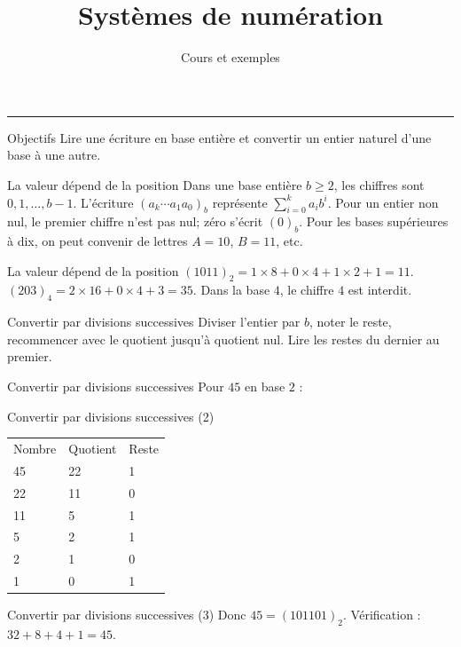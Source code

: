 \documentclass[aspectratio=169,10pt]{beamer}
\title{Systèmes de numération}
\subtitle{Cours et exemples}
\date{}
\author{}
\begin{document}
\begin{frame}[plain]
\vfill
{\inserttitle\par}
\medskip
{\insertsubtitle\par}
\medskip
{\rule{\textwidth}{.5pt}}
\vfill
\end{frame}
\begin{frame}{Objectifs}
Lire une écriture en base entière et convertir un entier naturel d’une base à une autre.
\end{frame}
\begin{frame}{La valeur dépend de la position}
Dans une base entière \(b\ge2\), les chiffres sont \(0,1,\ldots,b-1\). L’écriture \((a_k\cdots a_1a_0)_b\) représente \(\sum_{i=0}^k a_i b^i\). Pour un entier non nul, le premier chiffre n’est pas nul; zéro s’écrit \((0)_b\). Pour les bases supérieures à dix, on peut convenir de lettres \(A=10\), \(B=11\), etc.
\end{frame}
\begin{frame}{La valeur dépend de la position}
\((1011)_2=1\times8+0\times4+1\times2+1=11\). \((203)_4=2\times16+0\times4+3=35\). Dans la base \(4\), le chiffre \(4\) est interdit.
\end{frame}
\begin{frame}{Convertir par divisions successives}
Diviser l’entier par \(b\), noter le reste, recommencer avec le quotient jusqu’à quotient nul. Lire les restes du dernier au premier.
\end{frame}
\begin{frame}{Convertir par divisions successives}
Pour \(45\) en base \(2\) :
\end{frame}
\begin{frame}{Convertir par divisions successives (2)}
\begin{center}\begin{tabular}{lll}
Nombre & Quotient & Reste \\ 
45 & 22 & 1 \\ 
22 & 11 & 0 \\ 
11 & 5 & 1 \\ 
5 & 2 & 1 \\ 
2 & 1 & 0 \\ 
1 & 0 & 1 \\ 
\end{tabular}\end{center}
\end{frame}
\begin{frame}{Convertir par divisions successives (3)}
Donc \(45=(101101)_2\). Vérification : \(32+8+4+1=45\).
\end{frame}
\end{document}
